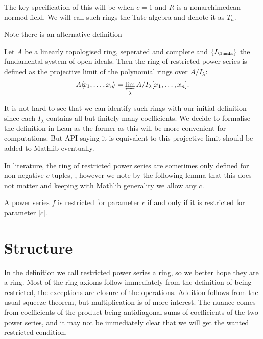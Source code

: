 The key specification of this will be when $c = 1$ and $R$ is a nonarchimedean normed field. We will
call such rings the Tate algebra and denote it as $T_n$.

Note there is an alternative definition \cite{...} %

\begin{definition}
  Let $A$ be a linearly topologised ring, seperated and complete and $\{ I_\lamda \}$ the fundamental
  system of open ideals. Then the ring of restricted power series is defined as the projective limit
  of the polynomial rings over $A / I_\lambda$:
  \[
    A \langle \! x_1, \dots, x_n \! \rangle = \varprojlim_\lambda A / I_\lambda [x_1, \dots, x_n].
  \]
\end{definition}

It is not hard to see that we can identify such rings with our initial definition since each $I_\lambda$
contains all but finitely many coefficients. We decide to formalise the definition in Lean as the former
as this will be more convenient for computations. But API saying it is equivalent to this projective
limit should be added to Mathlib eventually.

In literature, the ring of restricted power series are sometimes only defined for non-negative $c$-tuples,
\cite{Gouvea}, however we note by the following lemma that this does not matter and keeping with
Mathlib generality we allow any $c$.

\begin{lemma}
  A power series $f$ is restricted for parameter $c$ if and only if it is restricted for parameter
  $\lvert c \rvert$.
\end{lemma}

\section{Structure}

In the definition we call restricted power series a ring, so we better hope they are a ring. Most of
the ring axioms follow immediately from the definition of being restricted, the exceptions are
closure of the operations.
Addition follows from the usual squeeze theorem, but multiplication is of
more interest.
The nuance comes from coefficients of the product being antidiagonal sums of coefficients
of the two power series, and it may not be immediately clear that we will get the wanted restricted
condition.

